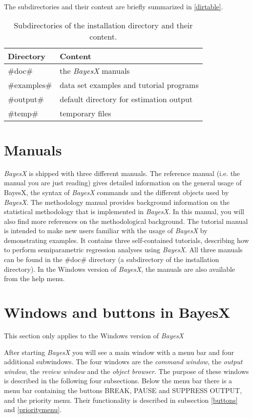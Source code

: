 The subdirectories and their content are briefly summarized in \autoref{dirtable}.

\begin{table}[ht]
\begin{center}
\begin{tabular}{|l|l|}
\hline
Directory & Content \\
\hline
#doc# & the {\em BayesX} manuals \\
#examples# & data set examples and tutorial programs \\
#output# & default directory for estimation output \\
#temp# & temporary files \\
\hline
\end{tabular}
{\em\caption{ \label{dirtable} Subdirectories of the installation directory and their content.}}
\end{center}
\end{table}

\section{Manuals}\label{bayesxmanuals}

{\em BayesX} is shipped with three different manuals. The reference manual (i.e. the manual you are just reading) gives
detailed information on the general usage of BayesX, the syntax of {\em BayesX} commands and the different objects used by {\em
BayesX}. The methodology manual provides background information on the statistical methodology that is implemented in {\em
BayesX}. In this manual, you will also find more references on the methodological background. The tutorial manual is intended
to make new users familiar with the usage of {\em BayesX} by demonstrating examples. It contains three self-contained
tutorials, describing how to perform semiparametric regression analyses using {\em BayesX}. All three manuals can be found in
the #doc# directory (a subdirectory of the installation directory). In the Windows version of {\it BayesX}, the manuals are
also available from the help menu.

\section{Windows and buttons in BayesX}\label{bayesxwindows}

This section only applies to the Windows version of {\it BayesX}

After starting {\em BayesX} you will see a main window with a menu bar and four additional subwindows. The four windows are the
{\em command window}, the {\em output window}, the {\em review window} and the {\em object browser}. The purpose of these
windows is described in the following four subsections. Below the menu bar there is a menu bar containing the buttons BREAK,
PAUSE and SUPPRESS OUTPUT, and the priority menu. Their functionality is described in subsection \ref{buttons} and
\ref{prioritymenu}.

